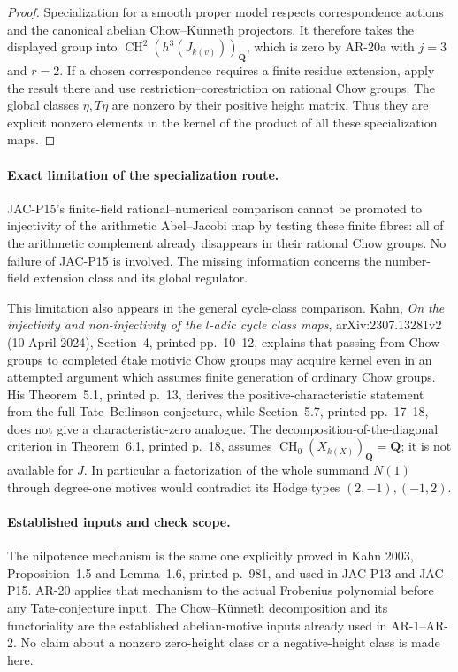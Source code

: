 \begin{proof}
Specialization for a smooth proper model respects correspondence
actions and the canonical abelian Chow--K\"unneth projectors.
It therefore takes the displayed group into
\(\operatorname{CH}^2(h^3(J_{k(v)}))_{\mathbf Q}\), which is zero
by AR-20a with \(j=3\) and \(r=2\). If a chosen correspondence
requires a finite residue extension, apply the result there and
use restriction--corestriction on rational Chow groups.
The global classes \(\eta,T\eta\) are nonzero by their positive
height matrix. Thus they are explicit nonzero elements in the
kernel of the product of all these specialization maps.
\end{proof}

\paragraph{Exact limitation of the specialization route.}
JAC-P15's finite-field rational--numerical comparison cannot
be promoted to injectivity of the arithmetic Abel--Jacobi map
by testing these finite fibres: all of the arithmetic complement
already disappears in their rational Chow groups. No failure of
JAC-P15 is involved. The missing information concerns the
number-field extension class and its global regulator.

This limitation also appears in the general cycle-class
comparison. Kahn, \emph{On the injectivity and non-injectivity of
the \(l\)-adic cycle class maps}, arXiv:2307.13281v2
(10 April 2024), Section~4, printed pp.~10--12, explains that
passing from Chow groups to completed \'{e}tale motivic Chow
groups may acquire kernel even in an attempted argument which
assumes finite generation of ordinary Chow groups. His
Theorem~5.1, printed p.~13, derives the positive-characteristic
statement from the full Tate--Beilinson conjecture, while
Section~5.7, printed pp.~17--18, does not give a
characteristic-zero analogue. The decomposition-of-the-diagonal
criterion in Theorem~6.1, printed p.~18, assumes
\(\operatorname{CH}_0(X_{k(X)})_{\mathbf Q}=\mathbf Q\);
it is not available for \(J\). In particular a factorization of
the whole summand \(N(1)\) through degree-one motives would
contradict its Hodge types \((2,-1),(-1,2)\).

\paragraph{Established inputs and check scope.}
The nilpotence mechanism is the same one explicitly proved in
Kahn 2003, Proposition~1.5 and Lemma~1.6, printed p.~981, and
used in JAC-P13 and JAC-P15. AR-20 applies that mechanism to
the actual Frobenius polynomial before any Tate-conjecture
input. The Chow--K\"unneth decomposition and its functoriality
are the established abelian-motive inputs already used in
AR-1--AR-2. No claim about a nonzero zero-height class or a
negative-height class is made here.
